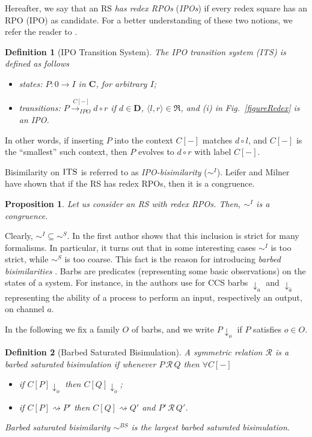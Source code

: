 \documentclass[copyright,creativecommons]{eptcs}
\makeatletter
\def\IPOtr#1{\stackrel{#1}{\rightarrowfill_{IPO}}}
\def \rightarrowfill{\m@th\mathord{\smash-}\mkern-6mu\cleaders\hbox{$\mkern-2mu\mathord{\smash-}\mkern-2mu$}\hfill
  \mkern-6mu\mathord\rightarrow}
\newcommand{\Rules}[1]{\mathfrak{#1}}
\newcommand{\barb}[1]{\downarrow_{#1}}
\newcommand{\bsbis}{\sim^{BS}}
\newcommand{\ilts}{\textsc{ITS}}
\def\IPOtr#1{\stackrel{#1}{\rightarrow_{IPO}}}
\newcommand{\react}{\rightsquigarrow}
\newcommand{\<}{\langle}
\renewcommand{\>}{\rangle}
\def \rightarrowfill{\m@th\mathord{\smash-}\mkern-6mu\cleaders\hbox{$\mkern-2mu\mathord{\smash-}\mkern-2mu$}\hfill
  \mkern-6mu\mathord\rightarrow}
\newtheorem{definition}{Definition}{}
\newtheorem{proposition}{Proposition}{}
\makeatother
\begin{document}
Hereafter, we say that an RS \emph{has redex RPOs} (\emph{IPOs})
if every redex square has an RPO (IPO) as candidate.
For a better understanding of these two
notions, we refer the reader to \cite{LICS2006}.


\begin{definition}[IPO Transition System]
The \emph{IPO transition system}
  (\ilts) is defined as follows
  \begin{itemize}
  \item states: $P:0\rightarrow I$ in $\mathbf{C}$, for
    arbitrary $I$;
  \item transitions: $P\IPOtr{C[-]} d\circ r$ if
    $d \in \mathbf{D}$,
    $\langle l,r \rangle \in \Rules{R}$,
    and (i) in Fig.~\ref{figureRedex} is an IPO.
  \end{itemize}
\end{definition}

In other words, if inserting $P$ into the context $C[-]$ matches
$d\circ l$, and $C[-]$ is the ``smallest'' such context,
then $P$ evolves to $d\circ r$ with label $C[-]$.


Bisimilarity on $\ilts$ is referred to as \emph{IPO-bisimilarity}
($\sim^{I}$).  Leifer and Milner have shown that if the RS has redex
RPOs, then it is a congruence.

\begin{proposition}\label{theoBiggest}
Let us consider an RS with redex RPOs. Then, $\sim^{I}$ is a congruence.
\end{proposition}

Clearly, $\sim^I\subseteq \sim^S$. In \cite{Bonchithesis} the first
author shows that this inclusion is strict for many formalisms. In
particular, it turns out that in some interesting cases $\sim^I$ is
too strict, while $\sim^S$ is too coarse. This fact is the reason for
introducing \emph{barbed bisimilarities} \cite{RobinICALP92}. Barbs
are predicates (representing some basic observations) on the states of
a system. For instance, in \cite{RobinICALP92} the authors use for CCS
barbs $\barb{a}$ and $\barb{\bar{a}}$ representing the ability of a
process to perform an input, respectively an output, on channel $a$.


In the following we fix a family $O$ of barbs, and we write
$P\barb{o}$ if $P$ satisfies $o \in O$.

\begin{definition}[Barbed Saturated Bisimulation]\label{def:BSbis}
A symmetric relation $\mathcal R$ is a \emph{barbed saturated
bisimulation} if whenever $P\, \mathcal R\,Q$ then $\forall C[-]$
\begin{itemize}
\item if $C[P]\barb{o}$ then $C[Q]\barb{o}$;
\item if $C[P]\react P'$ then $C[Q]\react Q'$ and $P'\, \mathcal R\,Q'$.
\end{itemize}
\emph{Barbed saturated bisimilarity} $\bsbis$ is the largest barbed
saturated bisimulation.
\end{definition}
\end{document}
